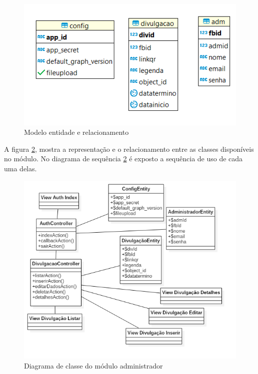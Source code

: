 \begin{figure}[H]
\centering
\includegraphics[scale=0.5]{figuras/entidaderelacionamento}
\caption{Modelo entidade e relacionamento}
\label{fig:casosDeUso}
\end{figure}

A figura \ref{fig:diagramaclasseADM}, mostra a representação e o relacionamento entre as classes disponíveis no módulo. No diagrama de sequência \ref{fig:diagramaclasseADM} é exposto a sequência de uso de cada uma delas. 
\begin{figure}[H]
\centering
\includegraphics[scale=0.5]{figuras/diagramaclasseADM}
\caption{Diagrama de classe do módulo administrador}
\label{fig:diagramaclasseADM}
\end{figure}

